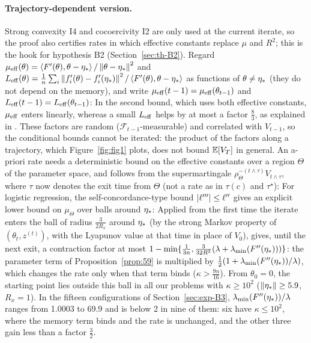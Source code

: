 \paragraph{Trajectory-dependent version.}
Strong convexity I4 and cocoercivity I2 are only used at the current iterate, so the proof also certifies rates in which
effective constants replace $\mu$ and $R^2$; this is the hook for hypothesis B2 (Section~\ref{sec:th-B2}). Regard
$\mu_{\mathrm{eff}}(\theta)=\left\langle F'(\theta), \theta-\eta_\ast \right\rangle/\left\|\theta-\eta_\ast\right\|^2$ and
$L_{\mathrm{eff}}(\theta)=\frac1n\sum_i\left\|f'_i(\theta)-f'_i(\eta_\ast)\right\|^2/\left\langle F'(\theta), \theta-\eta_\ast \right\rangle$ as functions of
$\theta\ne\eta_\ast$ (they do not depend on the memory), and write $\mu_{\mathrm{eff}}(t-1)=\mu_{\mathrm{eff}}(\theta_{t-1})$ and
$L_{\mathrm{eff}}(t-1)=L_{\mathrm{eff}}(\theta_{t-1})$:
In the second bound, which uses both effective constants, $\mu_{\mathrm{eff}}$ enters linearly, whereas a small $L_{\mathrm{eff}}$ helps by at
most a factor $\frac83$, as explained in . These factors are random ($\mathcal F_{t-1}$-measurable) and correlated with
$V_{t-1}$, so the conditional bounds cannot be iterated: the product of the factors along a trajectory, which
Figure~\ref{fig:fig1} plots, does not bound $\mathbb{E}[V_T]$ in general. An a-priori rate needs a deterministic bound on the
effective constants over a region $\Theta$ of the parameter space, and follows from the supermartingale
$\rho_\Theta^{-(t\wedge\tau)}V_{t\wedge\tau}$, where $\tau$ now denotes the exit time from $\Theta$ (not a rate as in
$\tau(c)$ and $\tau^\star$):
For logistic regression, the self-concordance-type bound $\left|\ell'''\right|\le\ell''$ \cite{bach2010self,bach2014adaptivity}
gives an explicit lower bound on $\mu_\Theta$ over balls around $\eta_\ast$:
Applied from the first time the iterate enters the ball of radius $\frac3{2R_x}$ around $\eta_\ast$ (by the strong Markov
property of $(\theta_t,z^{(t)})$, with the Lyapunov value at that time in place of $V_0$), 
gives, until the next exit, a contraction factor at most
$1-\min\{\frac1{3n},\frac{3}{32R^2}(\lambda+\lambda_{\min}(F''(\eta_\ast)))\}$: the parameter term of Proposition~\ref{prop:59} is
multiplied by $\frac12(1+\lambda_{\min}(F''(\eta_\ast))/\lambda)$, which changes the rate only when
that term binds ($\kappa>\frac{9n}{16}$). From $\theta_0=0$, the starting point lies outside this ball in all our
problems with $\kappa\ge10^2$ ($\left\|\eta_\ast\right\|\ge5.9$, $R_x=1$). In the fifteen configurations of
Section~\ref{sec:exp-B3}, $\lambda_{\min}(F''(\eta_\ast))/\lambda$ ranges from 1.0003 to 69.9 and is below 2 in nine of them: six
have $\kappa\le10^2$, where the memory term binds and the rate is unchanged, and the other three gain less than a
factor $\frac32$.

